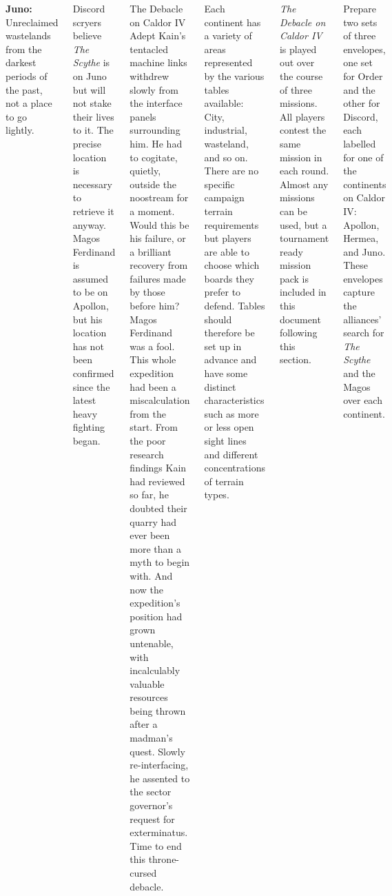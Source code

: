 \begin{columns}
\begin{squishitemize}
  \item \textbf{Juno:} Unreclaimed wastelands from the darkest periods
    of the past, not a place to go lightly.
  \end{squishitemize}

  Discord scryers believe \emph{The Scythe} is on Juno but will not
  stake their lives to it.  The precise location is necessary to
  retrieve it anyway.  Magos Ferdinand is assumed to be on Apollon,
  but his location has not been confirmed since the latest heavy
  fighting began.

\columnbreak
\begin{sidestory}{1.7in}{The Debacle on Caldor IV}
  Adept Kain's tentacled machine links withdrew slowly from the
  interface panels surrounding him. He had to cogitate, quietly,
  outside the noostream for a moment. Would this be his failure, or a
  brilliant recovery from failures made by those before him? Magos
  Ferdinand was a fool. This whole expedition had been a
  miscalculation from the start. From the poor research findings Kain
  had reviewed so far, he doubted their quarry had ever been more than
  a myth to begin with. And now the expedition's position had grown
  untenable, with incalculably valuable resources being thrown after a
  madman's quest. Slowly re-interfacing, he assented to the sector
  governor's request for exterminatus. Time to end this throne-cursed
  debacle.
\end{sidestory}


Each continent has a variety of areas represented by the various
tables available: City, industrial, wasteland, and so on.  There are
no specific campaign terrain requirements but players are able to
choose which boards they prefer to defend.  Tables should therefore be
set up in advance and have some distinct characteristics such as more
or less open sight lines and different concentrations of terrain
types.



\emph{The Debacle on Caldor IV} is played out over the course of three
missions.  All players contest the same mission in each round.  Almost
any missions can be used, but a tournament ready mission pack is
included in this document following this section.


Prepare two sets of three envelopes, one set for Order and the other
for Discord, each labelled for one of the continents on Caldor IV:
Apollon, Hermea, and Juno.  These envelopes capture the alliances'
search for \emph{The Scythe} and the Magos over each continent.


\end{columns}

